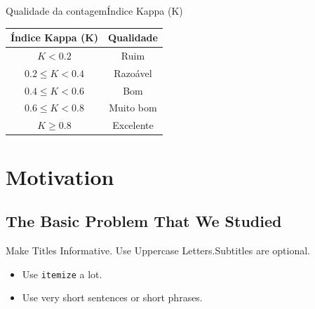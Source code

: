 \begin{frame}{Qualidade da contagem}{Índice Kappa (K)}
  \begin{center}
    \begin{tabular}{cc}
    \hline
    \textbf{Índice Kappa (K)} & \textbf{Qualidade} \\
    \hline
      $K < 0.2$ & Ruim \\
      $0.2 \leq K < 0.4$ & Razoável \\
      $0.4 \leq K < 0.6$ & Bom \\
      $0.6 \leq K < 0.8$ & Muito bom \\
      $K \geq 0.8$ & Excelente \\
    \hline
    \end{tabular}
  \end{center}
\end{frame}



\section{Motivation}

\subsection{The Basic Problem That We Studied}

\begin{frame}{Make Titles Informative. Use Uppercase Letters.}{Subtitles are optional.}

  \begin{itemize}
  \item
    Use \texttt{itemize} a lot.
  \item
    Use very short sentences or short phrases.
  \end{itemize}
\end{frame}

